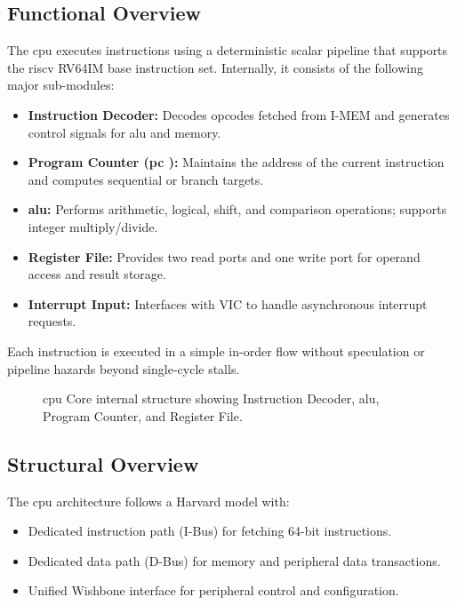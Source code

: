 \subsection{Functional Overview}
The \gls{cpu} executes instructions using a deterministic scalar \gls{pipeline} that supports the \gls{riscv} RV64IM base instruction set.
Internally, it consists of the following major sub-modules:
\begin{itemize}
    \item \textbf{Instruction Decoder:} Decodes opcodes fetched from \gls{I-MEM} and generates control signals for \gls{alu} and memory.
    \item \textbf{Program Counter (\gls{pc} ):} Maintains the address of the current instruction and computes sequential or branch targets.
    \item \textbf{\gls{alu}:} Performs arithmetic, logical, shift, and comparison operations; supports integer multiply/divide.
    \item \textbf{Register File:} Provides two read ports and one write port for operand access and result storage.
    \item \textbf{Interrupt Input:} Interfaces with VIC to handle asynchronous interrupt requests.
\end{itemize}

Each instruction is executed in a simple in-order flow without speculation or \gls{pipeline} hazards beyond single-cycle stalls.

\begin{figure}[H]
    \centering
    \caption{\gls{cpu} Core internal structure showing Instruction Decoder, \gls{alu}, Program Counter, and Register File.}
    \label{fig:cpu_structure}
\end{figure}

\subsection{Structural Overview}
The \gls{cpu} architecture follows a \gls{Harvard} model with:
\begin{itemize}
    \item Dedicated instruction path (I-Bus) for fetching 64-bit instructions.
    \item Dedicated data path (D-Bus) for memory and peripheral data transactions.
    \item Unified Wishbone interface for peripheral control and configuration.
\end{itemize}

